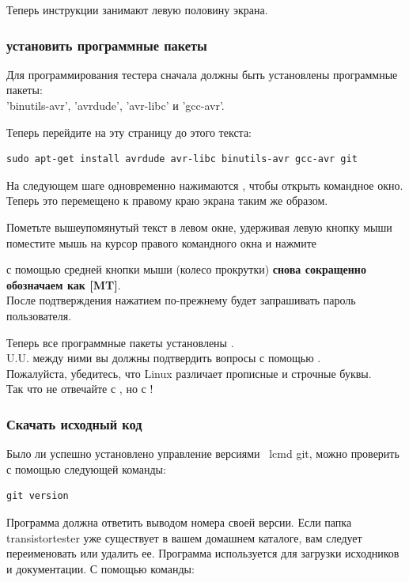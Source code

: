 Теперь инструкции занимают левую половину экрана.
\subsubsection{установить программные пакеты}
Для программирования тестера сначала должны быть установлены программные пакеты: \\
'binutils-avr', 'avrdude', 'avr-libc' и 'gcc-avr'.

Теперь перейдите на эту страницу до этого текста:

\begin{large} \vspace{-0.4em} \begin{verbatim}
sudo apt-get install avrdude avr-libc binutils-avr gcc-avr git
\end{verbatim} \end{large}
На следующем шаге одновременно нажимаются , чтобы открыть командное окно.
Теперь это перемещено к правому краю экрана таким же образом.

Пометьте вышеупомянутый текст в левом окне, удерживая левую кнопку мыши
\\ поместите мышь на курсор правого командного окна и нажмите

с помощью средней кнопки мыши (колесо прокрутки) \textbf {снова сокращенно обозначаем как [MT]}.\\
После подтверждения нажатием   по-прежнему будет запрашивать пароль пользователя.

Теперь все программные пакеты установлены . \\
U.U. между ними вы должны подтвердить вопросы с помощью .
\\ Пожалуйста, убедитесь, что Linux различает прописные и строчные буквы.
\\ Так что не отвечайте с , но с !
\subsubsection{Скачать исходный код}
Было ли успешно установлено управление версиями \ lcmd {git},
можно проверить с помощью следующей команды: 
\begin{large} \vspace{-0.4em} \begin{verbatim}
git version
\end{verbatim} \end{large}
Программа  должна ответить выводом номера своей версии.
Если папка transistortester уже существует в вашем домашнем каталоге,
вам следует переименовать или удалить ее.
Программа  используется для загрузки исходников и документации.
С помощью команды:

